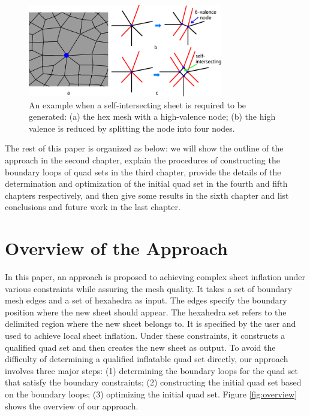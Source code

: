 \documentclass[final,5p,times,twocolumn]{elsarticle}
\begin{document}
\begin{figure}[htbp]
\begin{center}
\includegraphics[width=8.5cm]{rev_figures/intro_int_required.png}
\caption{An example when a self-intersecting sheet is required to be generated: (a) the hex mesh with a high-valence node; (b) the high valence is reduced by splitting the node into four nodes.}
\label{fig:intro_int_required}
\end{center}
\end{figure}

The rest of this paper is organized as below: we will show the outline of the approach in the second chapter, explain the procedures of constructing the boundary loops of quad sets in the third chapter, provide the details of the determination and optimization of the initial quad set in the fourth and fifth chapters respectively, and then give some results in the sixth chapter and list conclusions and future work in the last chapter.

\section{Overview of the Approach}
\label{sec:algo_overview}

In this paper, an approach is proposed to achieving complex sheet inflation under various constraints while assuring the mesh quality. It takes a set of boundary mesh edges and a set of hexahedra as input. The edges specify the boundary position where the new sheet should appear. The hexahedra set refers to the delimited region where the new sheet belongs to. It is specified by the user and used to achieve local sheet inflation. Under these constraints, it constructs a qualified quad set and then creates the new sheet as output. To avoid the difficulty of determining a qualified inflatable quad set directly, our approach involves three major steps: (1) determining the boundary loops for the quad set that satisfy the boundary constraints; (2) constructing the initial quad set based on the boundary loops; (3) optimizing the initial quad set. Figure \ref{fig:overview} shows the overview of our approach.
\end{document}
